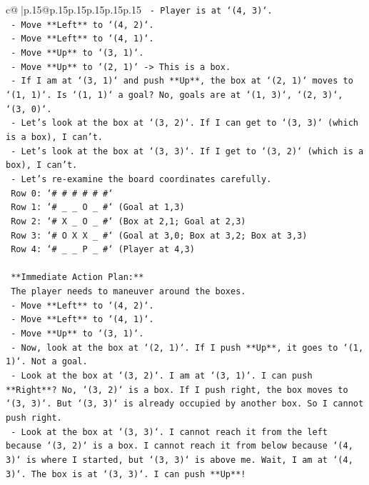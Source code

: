 \documentclass{article}
\begin{document}
{\begin{supertabular}{c@{$\;$}|p{.15\linewidth}@{}p{.15\linewidth}p{.15\linewidth}p{.15\linewidth}p{.15\linewidth}p{.15\linewidth}}
{{{\texttt{    {-}   Player is at `(4, 3)`.} \\
\texttt{    {-}   Move **Left** to `(4, 2)`.} \\
\texttt{    {-}   Move **Left** to `(4, 1)`.} \\
\texttt{    {-}   Move **Up** to `(3, 1)`.} \\
\texttt{    {-}   Move **Up** to `(2, 1)` {-}> This is a box.} \\
\texttt{    {-}   If I am at `(3, 1)` and push **Up**, the box at `(2, 1)` moves to `(1, 1)`. Is `(1, 1)` a goal? No, goals are at `(1, 3)`, `(2, 3)`, `(3, 0)`.} \\
\texttt{    {-}   Let's look at the box at `(3, 2)`. If I can get to `(3, 3)` (which is a box), I can't.} \\
\texttt{    {-}   Let's look at the box at `(3, 3)`. If I get to `(3, 2)` (which is a box), I can't.} \\
\texttt{    {-}   Let's re{-}examine the board coordinates carefully.} \\
\texttt{        Row 0: `\# \# \# \# \# \#`} \\
\texttt{        Row 1: `\# \_ \_ O \_ \#` (Goal at 1,3)} \\
\texttt{        Row 2: `\# X \_ O \_ \#` (Box at 2,1; Goal at 2,3)} \\
\texttt{        Row 3: `\# O X X \_ \#` (Goal at 3,0; Box at 3,2; Box at 3,3)} \\
\texttt{        Row 4: `\# \_ \_ P \_ \#` (Player at 4,3)} \\
\\ 
\texttt{    **Immediate Action Plan:**} \\
\texttt{    The player needs to maneuver around the boxes.} \\
\texttt{    {-}   Move **Left** to `(4, 2)`.} \\
\texttt{    {-}   Move **Left** to `(4, 1)`.} \\
\texttt{    {-}   Move **Up** to `(3, 1)`.} \\
\texttt{    {-}   Now, look at the box at `(2, 1)`. If I push **Up**, it goes to `(1, 1)`. Not a goal.} \\
\texttt{    {-}   Look at the box at `(3, 2)`. I am at `(3, 1)`. I can push **Right**? No, `(3, 2)` is a box. If I push right, the box moves to `(3, 3)`. But `(3, 3)` is already occupied by another box. So I cannot push right.} \\
\texttt{    {-}   Look at the box at `(3, 3)`. I cannot reach it from the left because `(3, 2)` is a box. I cannot reach it from below because `(4, 3)` is where I started, but `(3, 3)` is above me. Wait, I am at `(4, 3)`. The box is at `(3, 3)`. I can push **Up**!} \\
}}}
\end{supertabular}}
\end{document}

